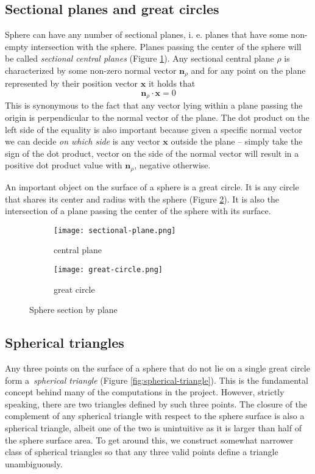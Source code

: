 \subsection{Sectional planes and great circles}
Sphere can have any number of sectional planes, i. e. planes that have some non-empty intersection with the sphere. Planes passing the center of the sphere will be called \textit{sectional central planes} (Figure \ref{fig:sectional-plane}). Any sectional central plane $\rho$ is characterized by some non-zero normal vector $\textbf{n}_\rho$ and for any point on the plane represented by their position vector $\mathbf{x}$ it holds that
$$\mathbf{n}_\rho\cdot\mathbf{x}=0$$
This is synonymous to the fact that any vector lying within a plane passing the origin is perpendicular to the normal vector of the plane. The dot product on the left side of the equality is also important because given a specific normal vector we can decide \textit{on which side} is any vector $\mathbf{x}$ outside the plane -- simply take the sign of the dot product, vector on the side of the normal vector will result in a positive dot product value with $\mathbf{n}_\rho$, negative otherwise.

An important object on the surface of a sphere is a great circle. It is any circle that shares its center and radius with the sphere (Figure \ref{fig:great-circle}). It is also the intersection of a plane passing the center of the sphere with its surface.
\begin{figure}[ht]
\centering
\begin{subfigure}{7cm}
\texttt{[image: sectional-plane.png]}
\caption{central plane}
\label{fig:sectional-plane}
\end{subfigure}
\begin{subfigure}{7cm}
\texttt{[image: great-circle.png]}
\caption{great circle}
\label{fig:great-circle}
\end{subfigure}
\caption{Sphere section by plane}
\label{fig:sectional-objects}
\end{figure}

\subsection{Spherical triangles}
\label{subsec:spherical-triangles}
Any three points on the surface of a sphere that do not lie on a single great circle form a~\textit{spherical triangle} (Figure \ref{fig:spherical-triangle}). This is the fundamental concept behind many of the computations in the project. However, strictly speaking, there are two triangles defined by such three points. The closure of the complement of any spherical triangle with respect to the sphere surface is also a spherical triangle, albeit one of the two is unintuitive as it is larger than half of the sphere surface area. To get around this, we construct somewhat narrower class of spherical triangles so that any three valid points define a triangle unambiguously.

